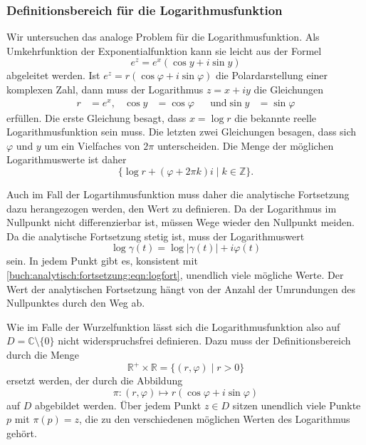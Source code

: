 \subsubsection{Definitionsbereich für die Logarithmusfunktion}
Wir untersuchen das analoge Problem für die Logarithmusfunktion.
Als Umkehrfunktion der Exponentialfunktion kann sie leicht aus
der Formel
\[
e^z
=
e^x(\cos y + i \sin y)
\]
abgeleitet werden.
Ist $e^z=r(\cos\varphi+i\sin\varphi)$ die Polardarstellung einer
komplexen Zahl, dann muss der Logarithmus $z=x+iy$ die Gleichungen
\begin{align*}
r&=e^x,
&
\cos y &= \cos\varphi
&&\text{und}
\sin y &= \sin\varphi
\end{align*}
erfüllen.
Die erste Gleichung besagt, dass $x=\log r$ die bekannte
reelle Logarithmusfunktion sein muss.
Die letzten zwei Gleichungen besagen, dass sich $\varphi$ und $y$
um ein Vielfaches von $2\pi$ unterscheiden.
Die Menge der möglichen Logarithmuswerte ist daher
\begin{equation}
\{
\log r
+
(\varphi
+
2\pi k)i
\mid
k\in\mathbb{Z}
\}.
\label{buch:analytisch:fortsetzung:eqn:logfort}
\end{equation}

Auch im Fall der Logartihmusfunktion muss daher die analytische
Fortsetzung dazu herangezogen werden, den Wert zu definieren.
Da der Logarithmus im Nullpunkt nicht differenzierbar ist, müssen
Wege wieder den Nullpunkt meiden.
Da die analytische Fortsetzung stetig ist, muss der Logarithmuswert
\[
\log\gamma(t)
=
\log|\gamma(t)| + i\varphi(t)
\]
sein.
In jedem Punkt gibt es, konsistent mit
\eqref{buch:analytisch:fortsetzung:eqn:logfort},
unendlich viele mögliche Werte.
Der Wert der analytischen Fortsetzung hängt von der Anzahl der
Umrundungen des Nullpunktes durch den Weg ab.

Wie im Falle der Wurzelfunktion lässt sich die Logarithmusfunktion
also auf $D=\mathbb{C}\setminus\{0\}$ nicht widerspruchsfrei
definieren.
Dazu muss der Definitionsbereich durch die Menge
\[
\mathbb{R}^+\times \mathbb{R}
=
\{
(r,\varphi)
\mid
r>0
\}
\]
ersetzt werden, der durch die Abbildung
\[
\pi
\colon
(r,\varphi)
\mapsto
r(\cos\varphi+i\sin\varphi)
\]
auf $D$ abgebildet werden.
Über jedem Punkt $z\in D$ sitzen unendlich viele Punkte $p$ mit
$\pi(p)=z$, die zu den verschiedenen möglichen Werten des Logarithmus
gehört.

%
%
